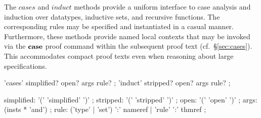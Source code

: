 The $cases$ and $induct$ methods provide a uniform interface to case analysis
and induction over datatypes, inductive sets, and recursive functions.  The
corresponding rules may be specified and instantiated in a casual manner.
Furthermore, these methods provide named local contexts that may be invoked
via the ${\mathord{\mathbf{case}}}$ proof command within the subsequent proof text (cf.\ 
\S\ref{sec:cases}).  This accommodates compact proof texts even when reasoning
about large specifications.

\begin{rail}
  'cases' simplified? open? args rule?
  ;
  'induct' stripped? open? args rule?
  ;

  simplified: '(' 'simplified' ')'
  ;
  stripped: '(' 'stripped' ')'
  ;
  open: '(' 'open' ')'
  ;
  args: (insts * 'and') 
  ;
  rule: ('type' | 'set') ':' nameref | 'rule' ':' thmref
  ;
\end{rail}


